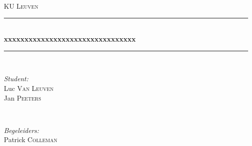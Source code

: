 
\begin{titlepage}

\newcommand{\HRule}{\rule{\linewidth}{0.5mm}} %

\center %
 

\textsc{\LARGE KU Leuven}\\[1.5cm] %



\HRule \\[0.4cm]
{ \huge \bfseries xxxxxxxxxxxxxxxxxxxxxxxxxxxxxxxx}\\[0.4cm] %
\HRule \\[1.5cm]
 

\begin{minipage}{0.4\textwidth}
\begin{flushleft} \large
\emph{Student:}\\
Luc \textsc{Van Leuven} \\ %
Jan \textsc{Peeters} %



\end{flushleft}
\end{minipage}
~
\begin{minipage}{0.4\textwidth}
\begin{flushright} \large
\emph{Begeleiders:} \\
Patrick \textsc{Colleman} \\%


\end{flushright}
\end{minipage}\\[2cm]


\end{titlepage}
